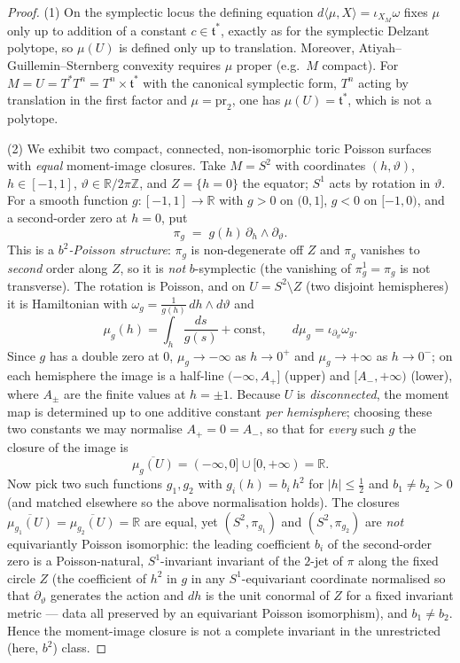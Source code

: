 \documentclass{amsart}
\theoremstyle{definition}
\begin{document}
\begin{proof}
(1) On the symplectic locus the defining equation
$d\langle\mu,X\rangle=\iota_{X_M}\omega$ fixes $\mu$ only up to addition of a
constant $c\in\mathfrak t^*$, exactly as for the symplectic Delzant polytope, so
$\mu(U)$ is defined only up to translation. Moreover, Atiyah--Guillemin--Sternberg
convexity requires $\mu$ proper (e.g.\ $M$ compact). For
$M=U=T^*T^n=T^n\times\mathfrak t^*$ with the canonical symplectic form, $T^n$
acting by translation in the first factor and $\mu=\mathrm{pr}_2$, one has
$\mu(U)=\mathfrak t^*$, which is not a polytope.

(2) We exhibit two compact, connected, non-isomorphic toric Poisson surfaces with
\emph{equal} moment-image closures. Take $M=S^2$ with coordinates
$(h,\vartheta)$, $h\in[-1,1]$, $\vartheta\in\mathbb R/2\pi\mathbb Z$, and
$Z=\{h=0\}$ the equator; $S^1$ acts by rotation in $\vartheta$. For a smooth
function $g\colon[-1,1]\to\mathbb R$ with $g>0$ on $(0,1]$, $g<0$ on $[-1,0)$,
and a second-order zero at $h=0$, put
\[
\pi_g \;=\; g(h)\,\partial_h\wedge\partial_\vartheta .
\]
This is a \emph{$b^2$-Poisson structure}: $\pi_g$ is non-degenerate off $Z$ and
$\pi_g$ vanishes to \emph{second} order along $Z$, so it is \emph{not}
$b$-symplectic (the vanishing of $\pi_g^{1}=\pi_g$ is not transverse). The
rotation is Poisson, and on $U=S^2\setminus Z$ (two disjoint hemispheres) it is
Hamiltonian with $\omega_g=\tfrac{1}{g(h)}\,dh\wedge d\vartheta$ and
\[
\mu_g(h)=\int_{h}\frac{ds}{g(s)}+\text{const},\qquad
d\mu_g=\iota_{\partial_\vartheta}\omega_g .
\]
Since $g$ has a double zero at $0$, $\mu_g\to-\infty$ as $h\to0^+$ and
$\mu_g\to+\infty$ as $h\to0^-$; on each hemisphere the image is a half-line
$(-\infty,A_+]$ (upper) and $[A_-,+\infty)$ (lower), where $A_\pm$ are the
finite values at $h=\pm1$. Because $U$ is \emph{disconnected}, the moment map is
determined up to one additive constant \emph{per hemisphere}; choosing these two
constants we may normalise $A_+=0=A_-$, so that for \emph{every} such $g$ the
closure of the image is
\[
\overline{\mu_g(U)}=(-\infty,0]\cup[0,+\infty)=\mathbb R .
\]
Now pick two such functions $g_1,g_2$ with $g_i(h)=b_i\,h^2$ for $|h|\le\tfrac12$
and $b_1\neq b_2>0$ (and matched elsewhere so the above normalisation holds).
The closures $\overline{\mu_{g_1}(U)}=\overline{\mu_{g_2}(U)}=\mathbb R$ are
equal, yet $(S^2,\pi_{g_1})$ and $(S^2,\pi_{g_2})$ are \emph{not} equivariantly
Poisson isomorphic: the leading coefficient $b_i$ of the second-order zero is a
Poisson-natural, $S^1$-invariant invariant of the $2$-jet of $\pi$ along the
fixed circle $Z$ (the coefficient of $h^2$ in $g$ in any $S^1$-equivariant
coordinate normalised so that $\partial_\vartheta$ generates the action and
$dh$ is the unit conormal of $Z$ for a fixed invariant metric --- data all
preserved by an equivariant Poisson isomorphism), and $b_1\neq b_2$. Hence the
moment-image closure is not a complete invariant in the unrestricted (here,
$b^2$) class.
\end{proof}
\end{document}
